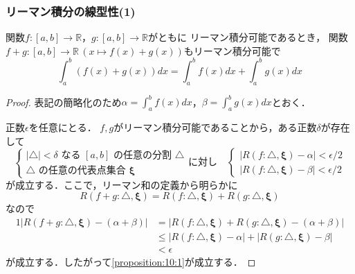 \documentclass[./index]{subfiles}
\begin{document}
\subsubsection{リーマン積分の線型性(1)}

\begin{screen}
    \begin{proposition}
        関数$f:[a,b]\rightarrow\mathbb{R}$，$g:[a,b]\rightarrow\mathbb{R}$がともに
        リーマン積分可能であるとき，
        関数$f+g: [a,b] \rightarrow \mathbb{R} \, (x \mapsto f(x) + g(x))$もリーマン積分可能で
        \begin{equation}
            \int_a^b (f(x) + g(x)) dx = \int_a^b f(x) dx + \int_a^b g(x) dx
            \label{proposition:10:1}
        \end{equation}
    \end{proposition}
\end{screen}

\begin{proof}
    表記の簡略化のため$\alpha = \int_a^b f(x) dx$，$\beta = \int_a^b g(x) dx$とおく．

    正数$\epsilon$を任意にとる．
    $f, g$がリーマン積分可能であることから，ある正数$\delta$が存在して
    \begin{equation}
        \nonumber
        \begin{cases}
            |\triangle| < \delta \mbox{ なる } [a, b] \mbox{ の任意の分割 } \triangle \\
            \triangle \mbox{ の任意の代表点集合 } \mathbf{\xi}
        \end{cases}
        \mbox{に対し} \quad
        \begin{cases}
            |R(f: \triangle, \mathbf{\xi}) - \alpha| < \epsilon / 2 \\
            |R(f: \triangle, \mathbf{\xi}) - \beta | < \epsilon / 2
        \end{cases}
    \end{equation}
    が成立する．ここで，リーマン和の定義から明らかに
    \begin{equation}
        R(f + g: \triangle, \mathbf{\xi}) = R(f: \triangle, \mathbf{\xi}) + R(g: \triangle, \mathbf{\xi})
    \end{equation}
    なので
    \begin{alignat}{1}
        |R(f + g: \triangle, \mathbf{\xi}) - (\alpha + \beta)|
            &= |R(f: \triangle, \mathbf{\xi}) + R(g: \triangle, \mathbf{\xi}) - (\alpha + \beta)| \\
            &\leq |R(f: \triangle, \mathbf{\xi}) - \alpha| + |R(g: \triangle, \mathbf{\xi}) - \beta| \\
            &< \epsilon
    \end{alignat}
    が成立する．したがって\cref{proposition:10:1}が成立する．
\end{proof}
\end{document}
